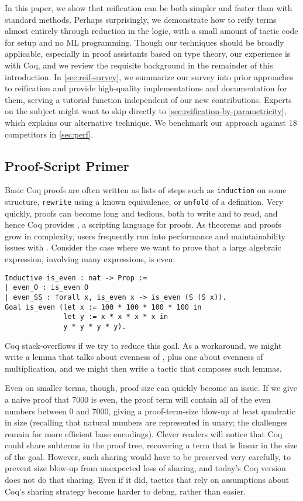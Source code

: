 In this paper, we show that reification can be both simpler and faster than with standard methods.
Perhaps surprisingly, we demonstrate how to reify terms almost entirely through reduction in the logic, with a small amount of tactic code for setup and no ML programming.
Though our techniques should be broadly applicable, especially in proof assistants based on type theory, our experience is with Coq, and we review the requisite background in the remainder of this introduction.
In \autoref{sec:reif-survey}, we summarize our survey into prior approaches to reification and provide high-quality implementations and documentation for them, serving a tutorial function independent of our new contributions.
Experts on the subject might want to skip directly to \autoref{sec:reification-by-parametricity}, which explains our alternative technique.
We benchmark our approach against 18 competitors in \autoref{sec:perf}.

\subsection{Proof-Script Primer}
Basic Coq proofs are often written as lists of steps such as \texttt{induction} on some structure, \texttt{rewrite} using a known equivalence, or \texttt{unfold} of a definition.
Very quickly, proofs can become long and tedious, both to write and to read, and hence Coq provides \Ltac, a scripting language for proofs.
As theorems and proofs grow in complexity, users frequently run into performance and maintainability issues with \Ltac.
Consider the case where we want to prove that a large algebraic expression, involving many \space expressions, is even:
\begin{verbatim}
Inductive is_even : nat -> Prop :=
| even_O : is_even O
| even_SS : forall x, is_even x -> is_even (S (S x)).
Goal is_even (let x := 100 * 100 * 100 * 100 in
              let y := x * x * x * x in
              y * y * y * y).
\end{verbatim}
Coq stack-overflows if we try to reduce this goal.
As a workaround, we might write a lemma that talks about evenness of , plus one about evenness of multiplication, and we might then write a tactic that composes such lemmas.

Even on smaller terms, though, proof size can quickly become an issue.
If we give a naive proof that 7000 is even, the proof term will contain all of the even numbers between 0 and 7000, giving a proof-term-size blow-up at least quadratic in size (recalling that natural numbers are represented in unary; the challenges remain for more efficient base encodings).
Clever readers will notice that Coq could share subterms in the proof tree, recovering a term that is linear in the size of the goal.
However, such sharing would have to be preserved very carefully, to prevent size blow-up from unexpected loss of sharing, and today's Coq version does not do that sharing.
Even if it did, tactics that rely on assumptions about Coq's sharing strategy become harder to debug, rather than easier.

